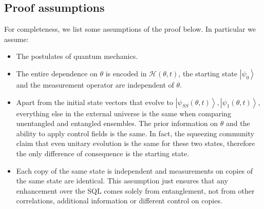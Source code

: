 \documentclass[reqno]{amsart}
\newcommand{\ket}[1]{\left| #1 \right>}
\newcommand{\hham}{\mathcal{H}}
\begin{document}
\subsection{Proof assumptions}\label{App:Assumptions}
For completeness, we list some assumptions of the proof below. In particular we assume:
\begin{itemize}
\item The postulates of quantum mechanics.
\item The entire dependence on $\theta$ is encoded in $\hham(\theta,t)$, the starting state $\ket{\psi_0}$ and the measurement operator are independent of $\theta$.
\item Apart from the initial state vectors that evolve to $\ket{\psi_{SS}(\theta,t)}, \ket{\psi_1(\theta,t)}$, everything else in the external universe is the same when comparing unentangled and entangled ensembles. The prior information on $\theta$ and the ability to apply control fields is the same. In fact, the squeezing community claim that even unitary evolution is the same for these two states, therefore the only difference of consequence is the starting state.
\item Each copy of the same state is independent and measurements on copies of the same state are identical. This assumption just ensures that any enhancement over the SQL comes solely from entanglement, not from other correlations, additional information or different control on copies.\\
\end{itemize}
\end{document}
